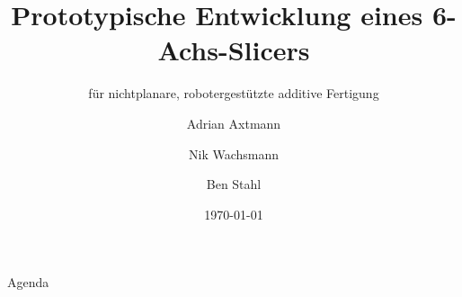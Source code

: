 \documentclass[aspectratio=169, 10pt]{beamer} %
\title[6-Achs-Slicer]{Prototypische Entwicklung eines 6-Achs-Slicers}
\subtitle{für nichtplanare, robotergestützte additive Fertigung}
\author[Axtmann, Wachsmann, Stahl]{Adrian Axtmann \and Nik Wachsmann \and Ben Stahl}
\institute[DHBW]{Studiengang Informatik \ DHBW Karlsruhe}
\date{\today}
\begin{document}
{
\begin{frame}
    \titlepage
\end{frame}
}

\begin{frame}{Agenda}
    \tableofcontents[hideallsubsections]
\end{frame}

% 









\end{document}

